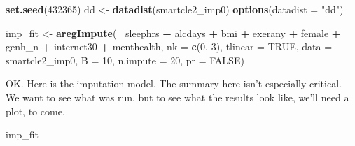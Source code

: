 \documentclass[]{book}
\newenvironment{Shaded}{\begin{snugshade}}{\end{snugshade}}
\newcommand{\KeywordTok}[1]{\textcolor[rgb]{0.13,0.29,0.53}{\textbf{#1}}}
\newcommand{\DataTypeTok}[1]{\textcolor[rgb]{0.13,0.29,0.53}{#1}}
\newcommand{\DecValTok}[1]{\textcolor[rgb]{0.00,0.00,0.81}{#1}}
\newcommand{\StringTok}[1]{\textcolor[rgb]{0.31,0.60,0.02}{#1}}
\newcommand{\OtherTok}[1]{\textcolor[rgb]{0.56,0.35,0.01}{#1}}
\newcommand{\OperatorTok}[1]{\textcolor[rgb]{0.81,0.36,0.00}{\textbf{#1}}}
\newcommand{\NormalTok}[1]{#1}
\theoremstyle{definition}
\theoremstyle{definition}
\theoremstyle{definition}
\theoremstyle{remark}
\begin{document}
\begin{Shaded}
\begin{Highlighting}[]
\KeywordTok{set.seed}\NormalTok{(}\DecValTok{432365}\NormalTok{)}
\NormalTok{dd <-}\StringTok{ }\KeywordTok{datadist}\NormalTok{(smartcle2_imp0)}
\KeywordTok{options}\NormalTok{(}\DataTypeTok{datadist =} \StringTok{"dd"}\NormalTok{)}

\NormalTok{imp_fit <-}\StringTok{ }\KeywordTok{aregImpute}\NormalTok{(}\OperatorTok{~}\StringTok{ }\NormalTok{sleephrs }\OperatorTok{+}\StringTok{ }\NormalTok{alcdays }\OperatorTok{+}\StringTok{ }\NormalTok{bmi }\OperatorTok{+}\StringTok{ }\NormalTok{exerany }\OperatorTok{+}
\StringTok{                          }\NormalTok{female }\OperatorTok{+}\StringTok{ }\NormalTok{genh_n }\OperatorTok{+}\StringTok{ }\NormalTok{internet30 }\OperatorTok{+}
\StringTok{                          }\NormalTok{menthealth, }
                   \DataTypeTok{nk =} \KeywordTok{c}\NormalTok{(}\DecValTok{0}\NormalTok{, }\DecValTok{3}\NormalTok{), }\DataTypeTok{tlinear =} \OtherTok{TRUE}\NormalTok{,}
                   \DataTypeTok{data =}\NormalTok{ smartcle2_imp0, }\DataTypeTok{B =} \DecValTok{10}\NormalTok{, }
                   \DataTypeTok{n.impute =} \DecValTok{20}\NormalTok{, }\DataTypeTok{pr =} \OtherTok{FALSE}\NormalTok{) }
\end{Highlighting}
\end{Shaded}

OK. Here is the imputation model. The summary here isn't especially
critical. We want to see what was run, but to see what the results look
like, we'll need a plot, to come.

\begin{Shaded}
\begin{Highlighting}[]
\NormalTok{imp_fit}
\end{Highlighting}
\end{Shaded}
\end{document}
